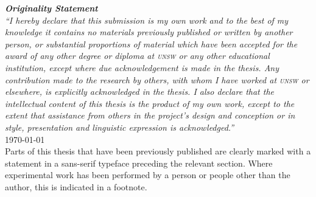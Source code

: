 \begin{center}
\begin{minipage}{0.75\textwidth}
\vspace{4cm}
  \textit{
    \textbf{Originality Statement}\\
    ``I hereby declare that this submission is my own work and to the best of my knowledge it contains no materials previously published or written by another person, or substantial proportions of material which have been accepted for the award of any other degree or diploma at \textsc{unsw} or any other educational institution, except where due acknowledgement is made in the thesis.
    Any contribution made to the research by others, with whom I have worked at \textsc{unsw} or elsewhere, is explicitly acknowledged in the thesis.
    I also declare that the intellectual content of this thesis is the product of my own work, except to the extent that assistance from others in the project's design and conception or in style, presentation and linguistic expression is acknowledged.''
  }
  \vspace{3cm}\\
  \hspace*{1cm}\today
  \vspace{1cm}\\
  Parts of this thesis that have been previously published are clearly marked with a statement in a sans-serif typeface preceding the relevant section.
  Where experimental work has been performed by a person or people other than the author, this is indicated in a footnote.
\end{minipage}
\end{center}
